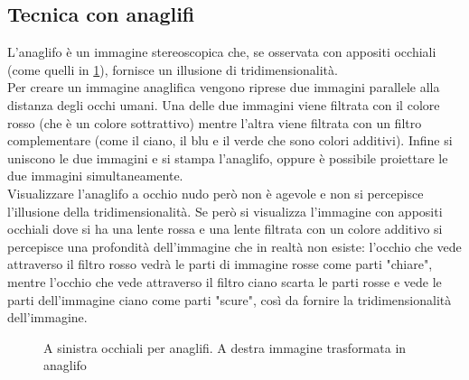 \documentclass[12pt,a4paper,openright,twoside]{book}
\begin{document}
    \subsection{Tecnica con anaglifi}
    L'anaglifo è un immagine stereoscopica che, se osservata con appositi occhiali (come quelli in \figurename \ref{fig:anagl}), fornisce un illusione di tridimensionalità.\\
    Per creare un immagine anaglifica vengono riprese due immagini parallele alla distanza degli occhi umani. Una delle due immagini viene filtrata con il colore rosso (che è un colore sottrattivo) mentre l'altra viene filtrata con un filtro complementare (come il ciano, il blu e il verde che sono colori additivi). Infine si uniscono le due immagini e si stampa l'anaglifo, oppure è possibile proiettare le due immagini simultaneamente.\\ Visualizzare l'anaglifo a occhio nudo però non è agevole e non si percepisce l'illusione della tridimensionalità. Se però si visualizza l'immagine con appositi occhiali dove si ha una lente rossa e una lente filtrata con un colore additivo si percepisce una profondità dell'immagine che in realtà non esiste: l'occhio che vede attraverso il filtro rosso vedrà le parti di immagine rosse come parti "chiare", mentre l'occhio che vede attraverso il filtro ciano scarta le parti rosse e vede le parti dell'immagine ciano come parti "scure", così da fornire la tridimensionalità dell'immagine. 
    \begin{figure}[h]
    	\centering
    	  \quad
    	\caption{A sinistra occhiali per anaglifi. A destra immagine trasformata in anaglifo}
    	\label{fig:anagl}
    \end{figure}
\newpage
\end{document}
